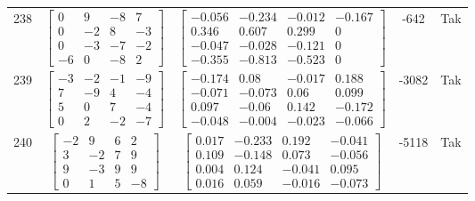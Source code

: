 \documentclass[a4paper,12pt]{article}
\begin{document}
\begin{tabular}{c c c c c}
238
&
$\begin{bmatrix} 0 & 9 & -8 & 7 \\ 0 & -2 & 8 & -3 \\ 0 & -3 & -7 & -2 \\ -6 & 0 & -8 & 2 \end{bmatrix}$
&
$\begin{bmatrix} -0.056 & -0.234 & -0.012 & -0.167 \\ 0.346 & 0.607 & 0.299 & 0 \\ -0.047 & -0.028 & -0.121 & 0 \\ -0.355 & -0.813 & -0.523 & 0 \end{bmatrix}$
&
-642
&
Tak
\\
239
&
$\begin{bmatrix} -3 & -2 & -1 & -9 \\ 7 & -9 & 4 & -4 \\ 5 & 0 & 7 & -4 \\ 0 & 2 & -2 & -7 \end{bmatrix}$
&
$\begin{bmatrix} -0.174 & 0.08 & -0.017 & 0.188 \\ -0.071 & -0.073 & 0.06 & 0.099 \\ 0.097 & -0.06 & 0.142 & -0.172 \\ -0.048 & -0.004 & -0.023 & -0.066 \end{bmatrix}$
&
-3082
&
Tak
\\
240
&
$\begin{bmatrix} -2 & 9 & 6 & 2 \\ 3 & -2 & 7 & 9 \\ 9 & -3 & 9 & 9 \\ 0 & 1 & 5 & -8 \end{bmatrix}$
&
$\begin{bmatrix} 0.017 & -0.233 & 0.192 & -0.041 \\ 0.109 & -0.148 & 0.073 & -0.056 \\ 0.004 & 0.124 & -0.041 & 0.095 \\ 0.016 & 0.059 & -0.016 & -0.073 \end{bmatrix}$
&
-5118
&
Tak
\\
\end{tabular} \egroup \newpage
\end{document}

